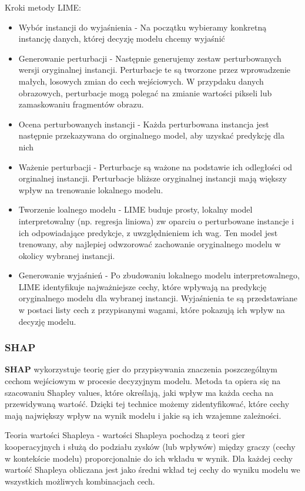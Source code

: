 Kroki metody LIME:
\begin{itemize}
	\item Wybór instancji do wyjaśnienia - Na początku wybieramy konkretną instancję danych, której decyzję modelu chcemy wyjaśnić
	\item Generowanie perturbacji - Następnie generujemy zestaw perturbowanych wersji oryginalnej instancji.
	      Perturbacje te są tworzone przez wprowadzenie małych, losowych zmian do cech wejściowych.
	      W przypdaku danych obrazowych, perturbacje mogą polegać na zmianie wartości pikseli lub zamaskowaniu fragmentów obrazu.
	\item Ocena perturbowanych instancji - Każda perturbowana instancja jest następnie przekazywana do orginalnego model, aby uzyskać predykcję dla nich
	\item Ważenie perturbacji - Perturbacje są ważone na podstawie ich odległości od orginalnej instancji.
	      Perturbacje bliższe oryginalnej instancji mają większy wpływ na trenowanie lokalnego modelu.
	\item Tworzenie loalnego modelu - LIME buduje prosty, lokalny model interpretowalny (np. regresja liniowa) zw oparciu o perturbowane instancje i ich odpowiadające predykcje, z uwzględnieniem ich wag.
	      Ten model jest trenowany, aby najlepiej odwzorować zachowanie oryginalnego modelu w okolicy wybranej instancji.
	\item Generowanie wyjaśnień - Po zbudowaniu lokalnego modelu interpretowalnego, LIME identyfikuje najważniejsze cechy, które wpływają na predykcję oryginalnego modelu dla wybranej instancji.
	      Wyjaśnienia te są przedstawiane w postaci listy cech z przypisanymi wagami, które pokazują ich wpływ na decyzję modelu.
\end{itemize}

\subsubsection*{SHAP}
\textbf{SHAP} wykorzystuje teorię gier do przypisywania znaczenia poszczególnym cechom wejściowym w procesie decyzyjnym modelu.
Metoda ta opiera się na szacowaniu Shapley values, które określają, jaki wpływ ma każda cecha na przewidywaną wartość.
Dzięki tej technice możemy zidentyfikować, które cechy mają największy wpływ na wynik modelu i jakie są ich wzajemne zależności.

Teoria wartości Shapleya - wartości Shapleya pochodzą z teori gier kooperacyjnych i służą do podziału zysków (lub wpływów) między graczy (cechy w kontekście modelu) proporcjonalnie do ich wkładu w wynik.
Dla każdej cechy wartość Shapleya obliczana jest jako średni wkład tej cechy do wyniku modelu we wszystkich możliwych kombinacjach cech.

